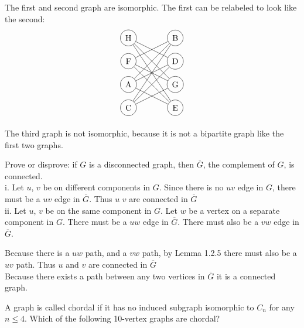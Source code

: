 \documentclass[12pt]{article}
\newenvironment{question}[2][Question]{\begin{trivlist}
\item[\hskip \labelsep {\bfseries #1}\hskip \labelsep {\bfseries #2.}]}{\end{trivlist}}
\begin{document}
	The first and second graph are isomorphic. The first can be relabeled to look like the second:
		\begin{align*}
	\begin{tikzpicture}
	\node[shape=circle,draw=black] (C) at (0,0) {C};
	\node[shape=circle,draw=black] (A) at (0,1) {A};
	\node[shape=circle,draw=black] (F) at (0,2) {F};
	\node[shape=circle,draw=black] (H) at (0,3) {H};
	\node[shape=circle,draw=black] (E) at (2,0) {E};
	\node[shape=circle,draw=black] (G) at (2,1) {G};
	\node[shape=circle,draw=black] (D) at (2,2) {D};
	\node[shape=circle,draw=black] (B) at (2,3) {B};
	\path [] (D) edge node[left] {} (A);
	\path [] (A) edge node[left] {} (B);
	\path [] (B) edge node[left] {} (C);
	\path [] (C) edge node[left] {} (D);
	\path [] (E) edge node[left] {} (F);
	\path [] (F) edge node[left] {} (G);
	\path [] (G) edge node[left] {} (H);
	\path [] (H) edge node[left] {} (E);
	\path [] (A) edge node[left] {} (E);
	\path [] (B) edge node[left] {} (F);
	\path [] (G) edge node[left] {} (C);
	\path [] (D) edge node[left] {} (H);
	\end{tikzpicture}
	\end{align*}
	
	The third graph is not isomorphic, because it is not a bipartite graph like the first two graphs.	
	
\begin{question}{5}
	Prove or disprove: if $G$ is a disconnected graph, then $\overline{G}$, the complement of $G$, is connected.\\	
	
	i. Let $u$, $v$ be on different components in $G$. Since there is no $uv$ edge in $G$, there must be a $uv$ edge in $\overline{G}$. Thus $u$ $v$ are connected in $\overline{G}$\\
		
	ii. Let $u$, $v$ be on the same component in $G$. Let $w$ be a vertex on a separate component in $G$. There must be a $uw$ edge in $\overline{G}$. There must also be a $vw$ edge in $\overline{G}$. 

	Because there is a $uw$ path, and a $vw$ path, by Lemma 1.2.5 there must also be a $uv$ path. Thus $u$ and $v$ are connected in $\overline{G}$\\

	Because there exists a path between any two vertices in $\overline{G}$ it is a connected graph.
\end{question}

\begin{question}{7}
A graph is called chordal if it has no induced subgraph isomorphic to $C_{n}$ for any $n \leq 4$. Which of the following 10-vertex graphs are chordal?
\end{question}
\end{document}
